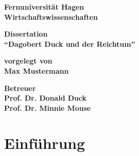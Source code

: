 \documentclass[12pt,ngerman]{scrreprt}
\begin{document}
\begin{titlepage}
{\large\bfseries \noindent Fernuniversität Hagen \\
Wirtschaftswissenschaften}

\vspace*{3cm}

\begin{center}
\huge\bfseries
Dissertation \\
\enquote{Dagobert Duck und der Reichtum}
\end{center}

\vspace*{3cm}

\begin{center}
\Large\bfseries
vorgelegt von \\
Max Mustermann
\end{center}

\vfill
\begin{flushleft}
\large\bfseries
Betreuer \\
Prof. Dr. Donald Duck \\
Prof. Dr. Minnie Mouse
\end{flushleft}
\end{titlepage}


\chapter{Einführung}
\end{document}
